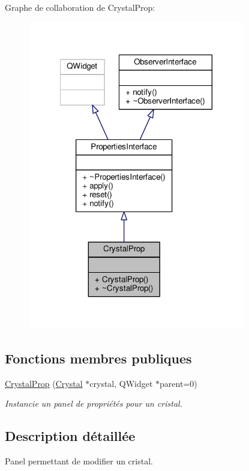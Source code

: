 Graphe de collaboration de Crystal\+Prop\+:
\nopagebreak
\begin{figure}[H]
\begin{center}
\leavevmode
\includegraphics[width=269pt]{d0/d15/classCrystalProp__coll__graph}
\end{center}
\end{figure}
\subsection*{Fonctions membres publiques}
\begin{DoxyCompactItemize}
\item 
\hyperlink{classCrystalProp_a47068eadccacdada66efdec58235ce94}{Crystal\+Prop} (\hyperlink{classCrystal}{Crystal} $\ast$crystal, Q\+Widget $\ast$parent=0)
\begin{DoxyCompactList}\small\item\em Instancie un panel de propriétés pour un cristal. \end{DoxyCompactList}\end{DoxyCompactItemize}


\subsection{Description détaillée}
Panel permettant de modifier un cristal. 

